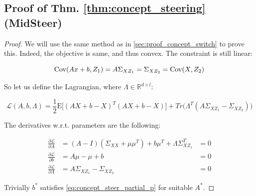 \subsection{Proof of Thm. \ref{thm:concept_steering} (MidSteer)}


\label{proof:midsteer}


\begin{proof}
	We will use the same method as in \ref{sec:proof_concept_switch} to prove this. Indeed, the objective is same, and thus convex. The constraint is still linear:
	
	
	\begin{equation}
		\mathrm{Cov}(Ax + b, Z_1) = A\Sigma_{XZ_1} = \Sigma_{XZ_2} = \mathrm{Cov}(X, Z_2)
	\end{equation}
	
	
	So let us define the Lagrangian, where $\Lambda \in \mathbb{R}^{d \times l}$:
	
	\begin{equation}
		\mathcal{L}(A, b, \Lambda) = \frac{1}{2} \mathrm{E} \Big[ (AX + b - X)^T (AX + b - X) \Big] + Tr \Big( \Lambda^T (A \Sigma_{XZ_1} - \Sigma_{XZ_2}) \Big)
	\end{equation}
	
	The derivatives w.r.t. parameters are the following:
	
	\begin{align}
		\label{eq:concept_steer_partial_A}
		\frac{\partial \mathcal{L}}{\partial A} &= (A - I) (\Sigma_{XX} + \mu \mu^T) + b\mu^T + \Lambda \Sigma_{XZ_1}^T &= 0 \\
		\label{eq:concept_steer_partial_p}
		\frac{\partial \mathcal{L}}{\partial b} &= A \mu - \mu + b &= 0 \\
		\label{eq:concept_steer_partial_lambda}
		\frac{\partial \mathcal{L}}{\partial \Lambda} &= A \Sigma_{XZ_1} - \Sigma_{XZ_2} &= 0
	\end{align}
	
	Trivially $b^*$ satisfies \eqref{eq:concept_steer_partial_p} for suitable $A^*$.
	

\end{proof}
